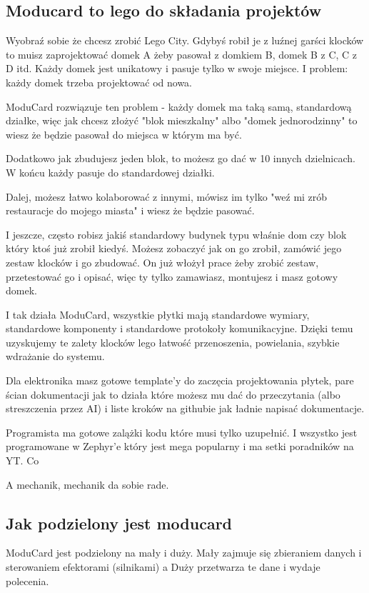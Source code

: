 \documentclass[b5paper, 10pt, twoside]{book}
\begin{document}
\subsection{Moducard to lego do składania projektów}

Wyobraź sobie że chcesz zrobić Lego City. Gdybyś robił je z luźnej garści klocków to muisz zaprojektować domek A żeby pasował z domkiem B, domek B z C, C z D itd. Każdy domek jest unikatowy i pasuje tylko w swoje miejsce. I problem: każdy domek trzeba projektować od nowa.

ModuCard rozwiązuje ten problem - każdy domek ma taką samą, standardową działke, więc jak chcesz złożyć "blok mieszkalny" albo "domek jednorodzinny" to wiesz że będzie pasował do miejsca w którym ma być.

Dodatkowo jak zbudujesz jeden blok, to możesz go dać w 10 innych dzielnicach. W końcu każdy pasuje do standardowej działki.

Dalej, możesz łatwo kolaborować z innymi, mówisz im tylko "weź mi zrób restauracje do mojego miasta" i wiesz że będzie pasować.

I jeszcze, często robisz jakiś standardowy budynek typu właśnie dom czy blok który ktoś już zrobił kiedyś. Możesz zobaczyć jak on go zrobił, zamówić jego zestaw klocków i go zbudować. On już włożył prace żeby zrobić zestaw, przetestować go i opisać, więc ty tylko zamawiasz, montujesz i masz gotowy domek.

I tak działa ModuCard, wszystkie płytki mają standardowe wymiary, standardowe komponenty i standardowe protokoły komunikacyjne. Dzięki temu uzyskujemy te zalety klocków lego łatwość przenoszenia, powielania, szybkie wdrażanie do systemu.

Dla elektronika masz gotowe template'y do zaczęcia projektowania płytek, pare ścian dokumentacji jak to działa które możesz mu dać do przeczytania (albo streszczenia przez AI) i liste kroków na githubie jak ładnie napisać dokumentacje.

Programista ma gotowe zalążki kodu które musi tylko uzupełnić. I wszystko jest programowane w Zephyr'e który jest mega popularny i ma setki poradników na YT. Co 

A mechanik, mechanik da sobie rade.


\subsection{Jak podzielony jest moducard}
ModuCard jest podzielony na mały i duży. Mały zajmuje się zbieraniem danych i sterowaniem efektorami (silnikami) a Duży przetwarza te dane i wydaje polecenia.
\end{document}
